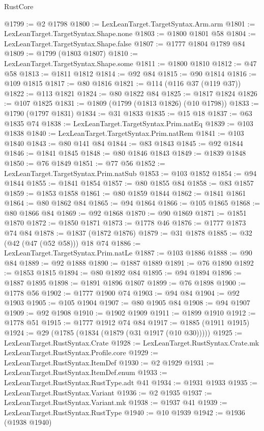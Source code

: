 \begin{lexlean}{RustCore}
\begin{coremodule}
@1799 := @2 @1798
@1800 := LexLeanTarget.TargetSyntax.Arm.arm
@1801 := LexLeanTarget.TargetSyntax.Shape.none
@1803 := @1800 @1801 @58
@1804 := LexLeanTarget.TargetSyntax.Shape.false
@1807 := @1777 @1804 @1789 @84
@1809 := @1799 (@1803 @1807)
@1810 := LexLeanTarget.TargetSyntax.Shape.some
@1811 := @1800 @1810
@1812 := @47 @58
@1813 := @1811 @1812
@1814 := @92 @84
@1815 := @90 @1814
@1816 := @109 @1815
@1817 := @80 @1816
@1821 := @114 (@116 @37 (@119 @37))
@1822 := @113 @1821
@1824 := @80 @1822 @84
@1825 := @1817 @1824
@1826 := @107 @1825
@1831 := @1809 (@1799 (@1813 @1826) (@10 @1798))
@1833 := @1790 (@1797 @1831)
@1834 := @31 @1833
@1835 := @15 @18
@1837 := @63 @1835 @74
@1838 := LexLeanTarget.TargetSyntax.Prim.natEq
@1839 := @103 @1838
@1840 := LexLeanTarget.TargetSyntax.Prim.natRem
@1841 := @103 @1840
@1843 := @80 @141 @84
@1844 := @83 @1843
@1845 := @92 @1844
@1846 := @1841 @1845
@1848 := @80 @1846 @1843
@1849 := @1839 @1848
@1850 := @76 @1849
@1851 := @77 @56
@1852 := LexLeanTarget.TargetSyntax.Prim.natSub
@1853 := @103 @1852
@1854 := @94 @1844
@1855 := @1841 @1854
@1857 := @80 @1855 @84
@1858 := @83 @1857
@1859 := @1853 @1858
@1861 := @80 @1859 @1844
@1862 := @1841 @1861
@1864 := @80 @1862 @84
@1865 := @94 @1864
@1866 := @105 @1865
@1868 := @80 @1866 @84
@1869 := @92 @1868
@1870 := @90 @1869
@1871 := @1851 @1870
@1872 := @1850 @1871
@1873 := @1778 @46
@1876 := @1777 @1873 @74 @84
@1878 := @1837 (@1872 @1876)
@1879 := @31 @1878
@1885 := @32 (@42 (@47 (@52 @58))) @18 @74
@1886 := LexLeanTarget.TargetSyntax.Prim.natLe
@1887 := @103 @1886
@1888 := @90 @84
@1889 := @92 @1888
@1890 := @1887 @1889
@1891 := @76 @1890
@1892 := @1853 @1815
@1894 := @80 @1892 @84
@1895 := @94 @1894
@1896 := @1887 @1895
@1898 := @1891 @1896 @1807
@1899 := @76 @1898
@1900 := @1778 @56
@1902 := @1777 @1900 @74
@1903 := @94 @84
@1904 := @92 @1903
@1905 := @105 @1904
@1907 := @80 @1905 @84
@1908 := @94 @1907
@1909 := @92 @1908
@1910 := @1902 @1909
@1911 := @1899 @1910
@1912 := @1778 @51
@1915 := @1777 @1912 @74 @84
@1917 := @1885 (@1911 @1915)
@1924 := @29 (@1785 (@1834 (@1879 (@31 @1917 (@10 @30)))))
@1925 := LexLeanTarget.RustSyntax.Crate
@1928 := LexLeanTarget.RustSyntax.Crate.mk LexLeanTarget.RustSyntax.Profile.core
@1929 := LexLeanTarget.RustSyntax.ItemDef
@1930 := @2 @1929
@1931 := LexLeanTarget.RustSyntax.ItemDef.enum
@1933 := LexLeanTarget.RustSyntax.RustType.adt @41
@1934 := @1931 @1933
@1935 := LexLeanTarget.RustSyntax.Variant
@1936 := @2 @1935
@1937 := LexLeanTarget.RustSyntax.Variant.mk
@1938 := @1937 @41
@1939 := LexLeanTarget.RustSyntax.RustType
@1940 := @10 @1939
@1942 := @1936 (@1938 @1940)

\end{coremodule}
\end{lexlean}

